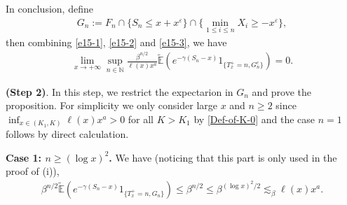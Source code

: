 \documentclass[11pt]{article}
\numberwithin{equation}{section}
\begin{document}
In conclusion,  define
\begin{align}
	G_n:= F_n\cap \{S_n\leq x+x^\varepsilon\} \cap \Big\{\min_{1\leq i\leq n} X_i \geq -x^{\varepsilon} \Big\},
\end{align} 
then combining \eqref{e15-1}, \eqref{e15-2} and \eqref{e15-3}, we have 
\begin{align}\label{e15}
	\lim_{x\to+\infty} \sup_{n\in \mathbb{N}}\frac{ \beta^{n/2} }{\ell(x) x^a} \widetilde{\mathbb{E}}\left(e^{-\gamma (S_n-x)}1_{\{T_x^+=n, G_n^c\}}\right) =0. 
\end{align}

\noindent
{\bf(Step 2)}. In this step, we  restrict the expectarion in $G_n$ and prove the proposition. 
 For simplicity we only consider large $x$ and  $n\geq 2$ since   $\inf_{x\in (K_1, K)}\ell(x)x^a >0$ for all $K>K_1$ by \eqref{Def-of-K-0} and the case $n=1$ follows by direct calculation. 
 
 \noindent
 {\bf Case 1: $n  \geq (\log x)^2$.}  We have (noticing that this part is only used in the proof of (i)),
\begin{align}\label{e17}
	 \beta^{n/2} \widetilde{\mathbb{E}}\left(e^{-\gamma (S_n-x)}1_{\{T_x^+=n, G_n\}}\right) \leq  \beta^{n/2}\leq  \beta^{(\log x)^2/2}\lesssim_\beta   \ell(x)x^a.
\end{align}
\end{document}
